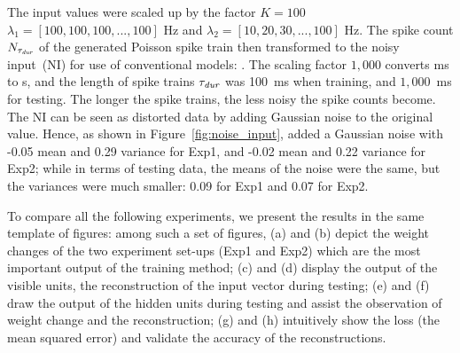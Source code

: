 The \DIFdelbegin {}\DIFdelend input values were scaled up by the factor \DIFaddbegin {}\DIFaddend $K = 100$\DIFdelbegin {}\DIFdelend \DIFaddbegin {}\DIFaddend $\lambda_1 = [100, 100, 100, ..., 100]$ Hz and $\lambda_2 = [10, 20, 30, ..., 100]$ Hz.
The spike count $N_{\tau_{\textit{\textrm{dur}}}}$ of the generated Poisson spike train then transformed to the noisy input~(NI) for use of conventional models: \DIFdelbegin {}\DIFdelend \DIFaddbegin {}\DIFaddend .
The scaling factor $1,000$ converts ms to s, and the length of spike trains $\tau_{\textit{\textrm{dur}}}$ was 100~ms when training, and $1,000$~ms for testing.
The longer the spike trains, the less noisy the spike counts become.
The NI can be seen as distorted data by adding Gaussian noise to the original value.
\DIFaddbegin {}\DIFaddend Hence, as shown in Figure~\ref{fig:noise_input}, \DIFdelbegin {}\DIFdelend \DIFaddbegin {}\DIFaddend added a Gaussian noise with -0.05 mean and 0.29 variance for Exp1\DIFdelbegin {}\DIFdelend , and -0.02 mean and 0.22 variance for Exp2;
while in terms of testing data, the means of the noise were the same, but the variances were much smaller: 0.09 for Exp1 and 0.07 for Exp2.


To compare all the following experiments, we present the results in the same template of figures:
among such a set of figures, (a) and (b) depict the weight changes of the two experiment set-ups (Exp1 and Exp2) which are the most important output of the training method;
(c) and (d) display the output of the visible units, the reconstruction of the input vector during testing;
(e) and (f) draw the output of the hidden units during testing and assist the observation of weight change and the reconstruction;
(g) and (h) intuitively show the loss (the mean squared error) and validate the accuracy of the reconstructions.

